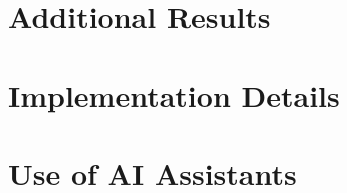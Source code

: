 \documentclass[11pt]{article}
\begin{document}
\appendix

\section{Additional Results}
\label{app:additional-results}


\section{Implementation Details}
\label{app:implementation-details}


% 

\section{Use of AI Assistants}
\label{app:ai-assistants}

\end{document}
